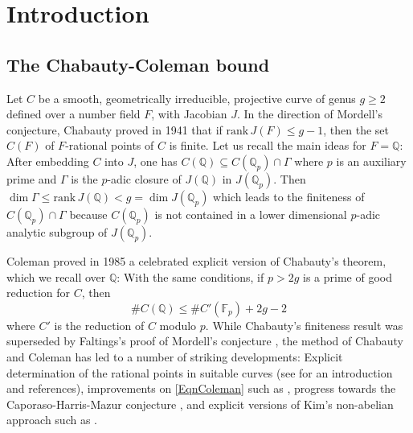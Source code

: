 \documentclass[11pt]{amsart}
\theoremstyle{remark}
\numberwithin{equation}{section}
\newcommand{\F}{\mathbb{F}}
\newcommand{\Q}{\mathbb{Q}}
\newcommand{\rk}{\mathrm{rank}\,}
\begin{document}



\maketitle


\setcounter{tocdepth}{1}
\tableofcontents



\section{Introduction}

\subsection{The Chabauty-Coleman bound} Let $C$ be a smooth, geometrically irreducible, projective curve of genus $g\ge 2$ defined over a number field $F$, with Jacobian $J$. In the direction of Mordell's conjecture, Chabauty \cite{Chabauty} proved in 1941 that if $\rk J(F)\le g-1$, then the set $C(F)$ of $F$-rational points of $C$ is finite. Let us recall the main ideas for $F=\Q$: After embedding $C$ into $J$, one has $C(\Q)\subseteq C(\Q_p)\cap \Gamma$ where $p$ is an auxiliary prime and $\Gamma$ is the $p$-adic closure of $J(\Q)$ in $J(\Q_p)$. Then $\dim \Gamma \le \rk J(\Q)<g=\dim J(\Q_p)$ which leads to the finiteness of $C(\Q_p)\cap \Gamma$ because $C(\Q_p)$ is not contained in a lower dimensional $p$-adic analytic subgroup of $J(\Q_p)$.

 Coleman \cite{Coleman} proved in 1985 a celebrated explicit version of Chabauty's theorem, which we recall over $\Q$: With the same conditions, if $p>2g$ is a prime of good reduction for $C$, then 
\begin{equation}\label{EqnColeman}
\#C(\Q)\le  \#C'(\F_p) +2g-2
\end{equation} 
where $C'$ is the reduction of $C$ modulo $p$. While Chabauty's finiteness result was superseded by Faltings's proof of Mordell's conjecture \cite{Faltings1}, the method of Chabauty and Coleman has led to a number of striking developments: Explicit determination of the rational points in suitable curves (see \cite{MPsurvey} for an introduction and references), improvements on \eqref{EqnColeman} such as \cite{LorenziniTucker, MPsurvey, Stollr, KatzZB}, progress towards the Caporaso-Harris-Mazur conjecture  \cite{Stoll, KRZ}, and explicit versions of Kim's non-abelian approach \cite{Kim} such as \cite{BBM, BD1, BDeffChKim, BD2,  BDMTV,  EdixhovenLido}. 
\end{document}
